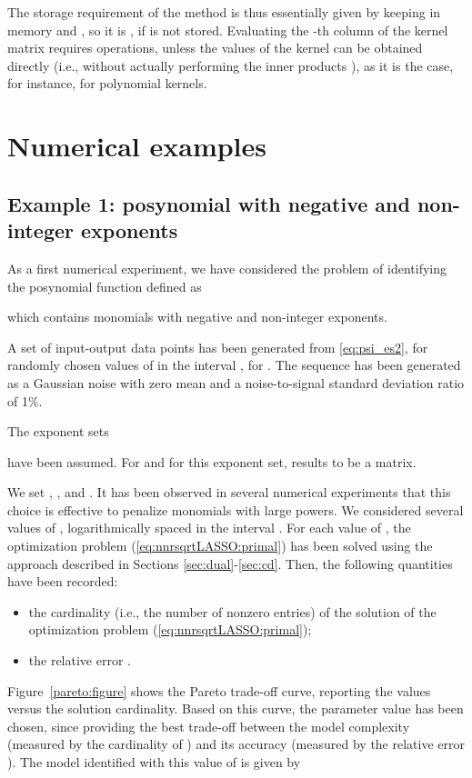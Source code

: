 \documentclass[11pt]{article}
\begin{document}
The storage requirement of the method is thus essentially given by keeping in memory  
and , so it is , if  is not stored. Evaluating the -th column of the kernel matrix requires  operations, unless the values of the kernel can be obtained directly (i.e., without actually performing the inner products ), as it is the case, for instance, for polynomial kernels.

\section{Numerical examples}
\label{sec:numes}

\subsection{Example 1: posynomial with negative and non-integer exponents}

\label{sub:toy_example}

As a first numerical experiment, we have considered the problem of
identifying the posynomial function 
defined as

which contains monomials with negative
and non-integer exponents. 

A set 
of  input-output data points has been generated from \eqref{eq:psi_es2},
for randomly chosen values of  in the interval ,
for . The sequence  has been generated as a Gaussian
noise with zero mean and a noise-to-signal standard deviation ratio
of 1\%. 

The exponent sets 

have been assumed. For  and for this exponent set, 
results to be a  matrix.

We set ,
, and . It has been
observed in several numerical experiments that this choice is effective
to penalize monomials with large powers. We considered several values
of , logarithmically spaced in the interval .
For each value of , the optimization problem (\ref{eq:nnrsqrtLASSO:primal})
has been solved using the approach described in Sections \ref{sec:dual}-\ref{sec:cd}.
Then, the following quantities have been recorded: 
\begin{itemize}
\item the cardinality (i.e., the number of nonzero entries) of the solution
 of the optimization problem (\ref{eq:nnrsqrtLASSO:primal}); 
\item the relative error . 
\end{itemize}
\noindent Figure~\ref{pareto:figure} shows the Pareto trade-off curve,
reporting the  values versus the solution cardinality. Based
on this curve, the parameter value  has been chosen,
since providing the best trade-off between the model complexity (measured
by the cardinality of ) and its accuracy (measured by the relative
error ). The model identified with this value of  is
given by
\end{document}
